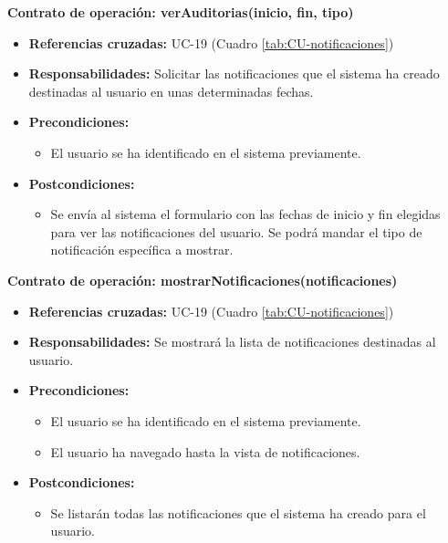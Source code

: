 \textbf{Contrato de operación: verAuditorias(inicio, fin, tipo)}
\begin{itemize}
\item \textbf{Referencias cruzadas:} UC-19 (Cuadro \ref{tab:CU-notificaciones})
\item \textbf{Responsabilidades:} Solicitar las notificaciones que el sistema ha creado destinadas al usuario en unas determinadas fechas.
\item \textbf{Precondiciones:} 
 \begin{itemize}
\item El usuario se ha identificado en el sistema previamente.
\end {itemize}
\item \textbf{Postcondiciones:} 
 \begin{itemize}
\item Se envía al sistema el formulario con las fechas de inicio y fin elegidas para ver las notificaciones del usuario. Se podrá mandar el tipo de notificación específica a mostrar.
\end {itemize}
\end {itemize}

\textbf{Contrato de operación: mostrarNotificaciones(notificaciones)}
\begin{itemize}
\item \textbf{Referencias cruzadas:} UC-19 (Cuadro \ref{tab:CU-notificaciones})
\item \textbf{Responsabilidades:} Se mostrará la lista de notificaciones destinadas al usuario.
\item \textbf{Precondiciones:} 
 \begin{itemize}
\item El usuario se ha identificado en el sistema previamente.
\item El usuario ha navegado hasta la vista de notificaciones.
\end {itemize}
\item \textbf{Postcondiciones:} 
 \begin{itemize}
\item Se listarán todas las notificaciones que el sistema ha creado para el usuario.
\end {itemize}
\end {itemize}


\vspace{7mm}
\dotfill
\vspace{7mm}

